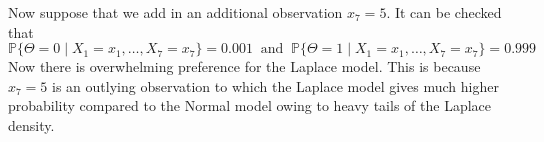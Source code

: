 \documentclass{scrartcl}
\renewcommand{\P}{{\mathbb P}}
\begin{document}
Now suppose that we add in an additional observation $x_7 =
5$. It can be checked that
\begin{equation*}
    \P\{\Theta = 0 \mid X_1 = x_1, \dots, X_7 = x_7\}  =  0.001 ~ \text{ and
    } ~ \P\{\Theta = 1 \mid X_1 = x_1, \dots, X_7 = x_7\}  = 0.999
\end{equation*}
Now there is overwhelming preference for the Laplace model. This is
because $x_7 = 5$ is an outlying observation to which the Laplace model
gives much higher probability compared to the Normal model owing to
heavy tails of the Laplace density. 



\end{document}
